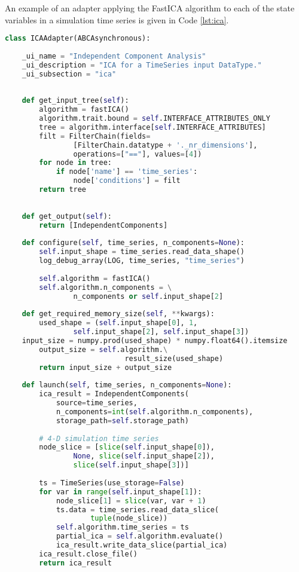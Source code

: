 \documentclass{bioinfo}
\begin{document}
An example of an adapter applying the FastICA algorithm to each of the 
state variables in a simulation time series is given in Code \ref{lst:ica}.

\begin{lstlisting}[language=Python]
class ICAAdapter(ABCAsynchronous):
    
    _ui_name = "Independent Component Analysis"
    _ui_description = "ICA for a TimeSeries input DataType."
    _ui_subsection = "ica"
    
    
    def get_input_tree(self):
        algorithm = fastICA()
        algorithm.trait.bound = self.INTERFACE_ATTRIBUTES_ONLY
        tree = algorithm.interface[self.INTERFACE_ATTRIBUTES]
        filt = FilterChain(fields=
                [FilterChain.datatype + '._nr_dimensions'],
                operations=["=="], values=[4])
        for node in tree:
            if node['name'] == 'time_series':
                node['conditions'] = filt
        return tree
    
    
    def get_output(self):
        return [IndependentComponents]
    
    def configure(self, time_series, n_components=None):
        self.input_shape = time_series.read_data_shape()
        log_debug_array(LOG, time_series, "time_series")
        
        self.algorithm = fastICA()
        self.algorithm.n_components = \
                n_components or self.input_shape[2]
        
    def get_required_memory_size(self, **kwargs):
        used_shape = (self.input_shape[0], 1, 
                self.input_shape[2], self.input_shape[3])
	input_size = numpy.prod(used_shape) * numpy.float64().itemsize
        output_size = self.algorithm.\
                            result_size(used_shape)
        return input_size + output_size  
    
    def launch(self, time_series, n_components=None):
        ica_result = IndependentComponents(
            source=time_series,
            n_components=int(self.algorithm.n_components),
            storage_path=self.storage_path)
        
        # 4-D simulation time series
        node_slice = [slice(self.input_shape[0]), 
                None, slice(self.input_shape[2]), 
                slice(self.input_shape[3])]
        
        ts = TimeSeries(use_storage=False)
        for var in range(self.input_shape[1]):
            node_slice[1] = slice(var, var + 1)
            ts.data = time_series.read_data_slice(
                    tuple(node_slice))
            self.algorithm.time_series = ts 
            partial_ica = self.algorithm.evaluate()
            ica_result.write_data_slice(partial_ica)
        ica_result.close_file()
        return ica_result
\end{lstlisting}
\end{document}
